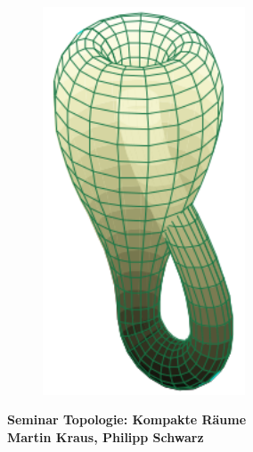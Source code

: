 \begin{titlepage}
\vspace{1 cm}
\begin{figure}[h]
	\centering
	\includegraphics[width=6cm]{0_logo.png}
	\label{fig:logo}
\end{figure}

\vspace{2 cm}
\begin{center}
\Huge
\textbf{Seminar Topologie: Kompakte Räume}\\
\vspace{0.1 cm}
\Large
\textbf{Martin Kraus, Philipp Schwarz}
\vspace{1 cm}
\end{center}

\vfill

\end{titlepage}
